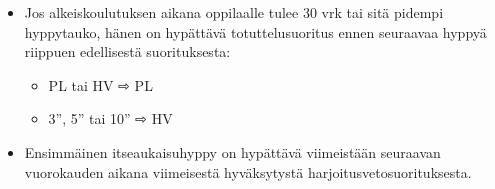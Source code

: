 \begin{itemize}
\item  Jos alkeiskoulutuksen aikana oppilaalle tulee 30 vrk tai sitä pidempi hyppytauko, hänen on hypättävä totuttelusuoritus ennen seuraavaa hyppyä riippuen edellisestä suorituksesta: 
	\begin{itemize}
	\item  PL tai HV ⇨ PL 
	\item  3'', 5'' tai 10'' ⇨ HV 
	\end{itemize}
\item  Ensimmäinen itseaukaisuhyppy on hypättävä viimeistään seuraavan vuorokauden aikana viimeisestä hyväksytystä harjoitusvetosuorituksesta. 
\end{itemize}
